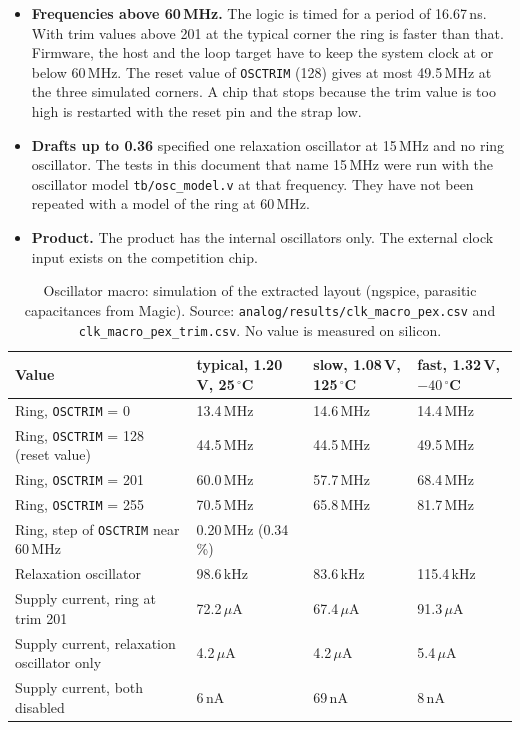 \documentclass[10pt,a4paper]{article}
\newcommand{\reg}[1]{\texttt{#1}}
\begin{document}
\begin{itemize}
\item \textbf{Frequencies above 60\,MHz.} The logic is timed for a period of 16.67\,ns. With trim values above
201 at the typical corner the ring is faster than that. Firmware, the host and the loop target have to
keep the system clock at or below 60\,MHz. The reset value of \reg{OSCTRIM} (128) gives at most 49.5\,MHz at the three
simulated corners. A chip that stops because the trim value is too high is restarted with the reset pin and
the strap low.
\item \textbf{Drafts up to 0.36} specified one relaxation oscillator at 15\,MHz and no ring oscillator. The
tests in this document that name 15\,MHz were run with the oscillator model \texttt{tb/osc\_model.v} at that
frequency. They have not been repeated with a model of the ring at 60\,MHz.
\item \textbf{Product.} The product has the internal oscillators only. The external clock input exists on the
competition chip.
\end{itemize}

\begin{table}[H]
\centering\small
\begin{tabularx}{\linewidth}{@{}Llll@{}}
\toprule
Value & typical, 1.20\,V, 25\,$^\circ$C & slow, 1.08\,V, 125\,$^\circ$C & fast, 1.32\,V, $-40\,^\circ$C \\
\midrule
Ring, \reg{OSCTRIM} = 0 & 13.4\,MHz & 14.6\,MHz & 14.4\,MHz \\
Ring, \reg{OSCTRIM} = 128 (reset value) & 44.5\,MHz & 44.5\,MHz & 49.5\,MHz \\
Ring, \reg{OSCTRIM} = 201 & 60.0\,MHz & 57.7\,MHz & 68.4\,MHz \\
Ring, \reg{OSCTRIM} = 255 & 70.5\,MHz & 65.8\,MHz & 81.7\,MHz \\
Ring, step of \reg{OSCTRIM} near 60\,MHz & 0.20\,MHz (0.34\,\%) & & \\
Relaxation oscillator & 98.6\,kHz & 83.6\,kHz & 115.4\,kHz \\
Supply current, ring at trim 201 & 72.2\,$\mu$A & 67.4\,$\mu$A & 91.3\,$\mu$A \\
Supply current, relaxation oscillator only & 4.2\,$\mu$A & 4.2\,$\mu$A & 5.4\,$\mu$A \\
Supply current, both disabled & 6\,nA & 69\,nA & 8\,nA \\
\bottomrule
\end{tabularx}
\caption{Oscillator macro: simulation of the extracted layout (ngspice, parasitic capacitances from Magic).
Source: \texttt{analog/results/clk\_macro\_pex.csv} and \texttt{clk\_macro\_pex\_trim.csv}. No value is measured
on silicon.}
\label{tab:oscsim}
\end{table}
\end{document}
